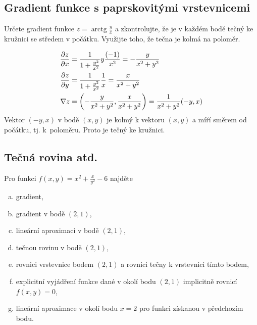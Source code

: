 \subsection{Gradient funkce s paprskovitými vrstevnicemi}

Určete gradient funkce $z=\mathop{\mathrm{arctg}} \frac yx$ a zkontrolujte, že je v každém bodě tečný ke kružnici se středem v počátku. Využijte toho, že tečna je kolmá na poloměr.


\reseni
\begin{align*}
  \pdv{z}{x} &= \frac1{1+\frac {y^2}{x^2}}y\frac {(-1)}{x^2}=-\frac{y}{x^2+y^2}\\
  \pdv{z}{y} &= \frac1{1+\frac {y^2}{x^2}}\frac 1x=\frac{x}{x^2+y^2}\\
  \nabla z &=  \left(-\frac{y}{x^2+y^2},\frac{x}{x^2+y^2}\right)= \frac{1}{x^2+y^2} (-y,x)
\end{align*}
Vektor $(-y,x)$ v bodě $(x,y)$ je kolmý k vektoru $(x,y)$ a míří směrem od počátku, tj. k~poloměru. Proto je tečný ke kružnici.
\konec



\subsection{Tečná rovina atd.}

Pro funkci $f(x,y)=x^2+\frac x{y^2}-6$ najděte
\begin{enumerate}[a)]
\item gradient, 
\item gradient v bodě $(2,1)$,
\item lineární aproximaci v bodě $(2,1)$,
\item tečnou rovinu v bodě $(2,1)$,
\item rovnici vrstevnice bodem $(2,1)$ a rovnici tečny k vrstevnici tímto bodem,
\item explicitní vyjádření funkce dané v okolí bodu $(2,1)$ implicitně rovnicí $f(x,y)=0$,
\item lineární aproximace v okolí bodu $x=2$ pro funkci získanou v předchozím bodu.
\end{enumerate}

